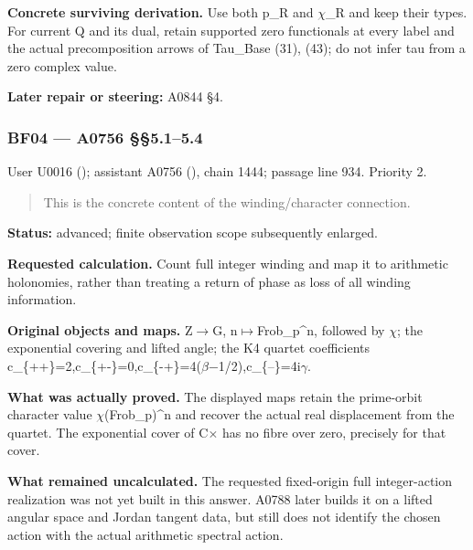 \textbf{Concrete surviving derivation.} Use both p\_R and
\allowbreak{}\ensuremath{χ}\allowbreak{}\_R and keep their types. For
current Q and its dual, retain supported zero functionals at every label
and the actual precomposition arrows of Tau\_Base (31), (43); do not
infer tau from a zero complex value.

\textbf{Later repair or steering:} A0844 §4.

\subsubsection{BF04 --- A0756 §§5.1--5.4}\label{TranscriptLedgerStage:bf04-a0756-5.15.4}

User U0016 (\protect{});
assistant A0756 (\protect{}),
chain 1444; passage line 934. Priority 2.

\begin{quote}
This is the concrete content of the winding/character connection.
\end{quote}

\textbf{Status:} advanced; finite observation scope subsequently
enlarged.

\textbf{Requested calculation.} Count full integer winding and map it to
arithmetic holonomies, rather than treating a return of phase as loss of
all winding information.

\textbf{Original objects and maps.}
Z\allowbreak{}\ensuremath{→}\allowbreak{}G,
n\allowbreak{}\ensuremath{↦}\allowbreak{}Frob\_p\textasciicircum{}n,
followed by \allowbreak{}\ensuremath{χ}\allowbreak{}; the exponential
covering and lifted angle; the K4 quartet coefficients
c\_\{++\}=2,c\_\{+-\}=0,c\_\{-+\}=4(\allowbreak{}\ensuremath{β}\allowbreak{}\allowbreak{}\ensuremath{−}\allowbreak{}1/2),c\_\{–\}=4i\allowbreak{}\ensuremath{γ}\allowbreak{}.

\textbf{What was actually proved.} The displayed maps retain the
prime-orbit character value
\allowbreak{}\ensuremath{χ}\allowbreak{}(Frob\_p)\textasciicircum{}n and
recover the actual real displacement from the quartet. The exponential
cover of C\allowbreak{}\ensuremath{×}\allowbreak{} has no fibre over
zero, precisely for that cover.

\textbf{What remained uncalculated.} The requested fixed-origin full
integer-action realization was not yet built in this answer. A0788 later
builds it on a lifted angular space and Jordan tangent data, but still
does not identify the chosen action with the actual arithmetic spectral
action.

